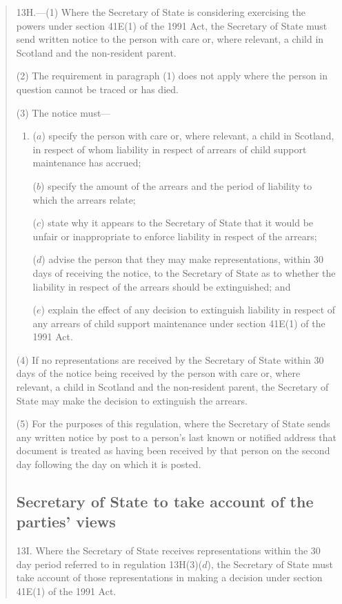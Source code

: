 \documentclass[12pt,a4paper]{article}
\begin{document}
\begin{quotation}
13H.---(1)  Where the Secretary of State is considering exercising the powers under section 41E(1) of the 1991 Act, the Secretary of State must send written notice to the person with care or, where relevant, a child in Scotland and the non-resident parent.

(2) The requirement in paragraph (1) does not apply where the person in question cannot be traced or has died.

(3) The notice must—
\begin{enumerate}\item[]
($a$) specify the person with care or, where relevant, a child in Scotland, in respect of whom liability in respect of arrears of child support maintenance has accrued;

($b$) specify the amount of the arrears and the period of liability to which the arrears relate;

($c$) state why it appears to the Secretary of State that it would be unfair or inappropriate to enforce liability in respect of the arrears;

($d$) advise the person that they may make representations, within 30 days of receiving the notice, to the Secretary of State as to whether the liability in respect of the arrears should be extinguished; and

($e$) explain the effect of any decision to extinguish liability in respect of any arrears of child support maintenance under section 41E(1) of the 1991 Act.
\end{enumerate}

(4) If no representations are received by the Secretary of State within 30 days of the notice being received by the person with care or, where relevant, a child in Scotland and the non-resident parent, the Secretary of State may make the decision to extinguish the arrears.

(5) For the purposes of this regulation, where the Secretary of State sends any written notice by post to a person’s last known or notified address that document is treated as having been received by that person on the second day following the day on which it is posted.

\subsection*{Secretary of State to take account of the parties’ views}

13I.  Where the Secretary of State receives representations within the 30 day period referred to in regulation 13H(3)($d$), the Secretary of State must take account of those representations in making a decision under section 41E(1) of the 1991 Act.


\end{quotation}
\end{document}
